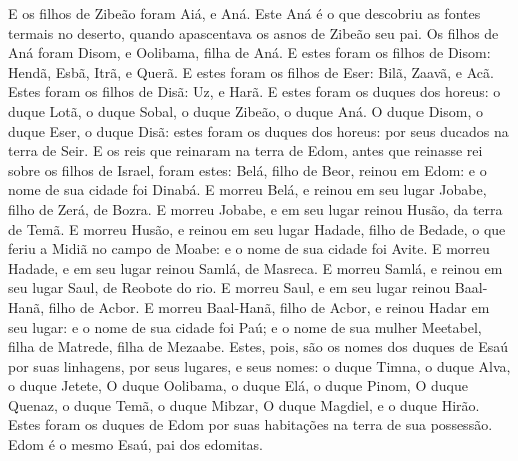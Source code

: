 {{  E os filhos de Zibeão foram Aiá, e Aná. Este Aná é o que descobriu as fontes termais no deserto, quando apascentava os asnos de Zibeão seu pai.
  Os filhos de Aná foram Disom, e Oolibama, filha de Aná.
  E estes foram os filhos de Disom: Hendã, Esbã, Itrã, e Querã.
  E estes foram os filhos de Eser: Bilã, Zaavã, e Acã.
  Estes foram os filhos de Disã: Uz, e Harã.
  E estes foram os duques dos horeus: o duque Lotã, o duque Sobal, o duque Zibeão, o duque Aná.
  O duque Disom, o duque Eser, o duque Disã: estes foram os duques dos horeus: por seus ducados na terra de Seir.
  E os reis que reinaram na terra de Edom, antes que reinasse rei sobre os filhos de Israel, foram estes:
  Belá, filho de Beor, reinou em Edom: e o nome de sua cidade foi Dinabá.
  E morreu Belá, e reinou em seu lugar Jobabe, filho de Zerá, de Bozra.
  E morreu Jobabe, e em seu lugar reinou Husão, da terra de Temã.
  E morreu Husão, e reinou em seu lugar Hadade, filho de Bedade, o que feriu a Midiã no campo de Moabe: e o nome de sua cidade foi Avite.
  E morreu Hadade, e em seu lugar reinou Samlá, de Masreca.
  E morreu Samlá, e reinou em seu lugar Saul, de Reobote do rio.
  E morreu Saul, e em seu lugar reinou Baal-Hanã, filho de Acbor.
  E morreu Baal-Hanã, filho de Acbor, e reinou Hadar em seu lugar: e o nome de sua cidade foi Paú; e o nome de sua mulher Meetabel, filha de Matrede, filha de Mezaabe.
  Estes, pois, são os nomes dos duques de Esaú por suas linhagens, por seus lugares, e seus nomes: o duque Timna, o duque Alva, o duque Jetete,
  O duque Oolibama, o duque Elá, o duque Pinom,
  O duque Quenaz, o duque Temã, o duque Mibzar,
  O duque Magdiel, e o duque Hirão. Estes foram os duques de Edom por suas habitações na terra de sua possessão. Edom é o mesmo Esaú, pai dos edomitas.
\par }

}
